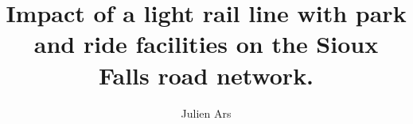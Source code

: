 \documentclass[10pt]{article}
\title{Impact of a light rail line with park and ride facilities on the Sioux Falls road network.}
\author{Julien Ars}
\begin{document}
\makecover

\newpage

\tableofcontents

\newpage


\newpage
\end{document}

